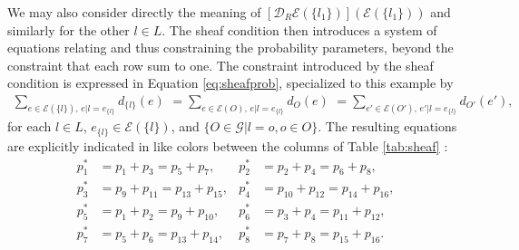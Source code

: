 \documentclass[10pt]{article}
\begin{document}
We may also consider directly the meaning of $\left[\mathcal{D}_R\mathcal{E}(\{l_1\})\right](\mathcal{E}(\{l_1\}))$ and similarly for the other $l \in L$. The sheaf condition then introduces a system of equations relating and thus constraining the probability parameters, beyond the constraint that each row sum to one. The constraint introduced by the sheaf condition is expressed in Equation \ref{eq:sheafprob}, specialized to this example by
\begin{eqnarray}\label{eq:sheafprob2}
\sum_{e \in \mathcal{E}(\{l\}),\, e|l=e_{\{l\}}} d_{\{l\}}(e) \,\, = \sum_{e \in \mathcal{E}(O),\, e|l=e_{\{l\}}} d_O(e) \,\, = \sum_{e' \in \mathcal{E}(O'),\, e'|l=e_{\{l\}}} d_{O'}(e'),
\end{eqnarray}
for each $l \in L$, $e_{\{l\}} \in \mathcal{E}(\{l\})$, and $\{O \in \mathcal{G}|l=o, o \in O\}$. The resulting equations are explicitly indicated in like colors between the columns of Table \ref{tab:sheaf} :
\begin{equation}
\begin{aligned}\label{eq:pparsys}
p^*_1 &= p_1 + p_3 = p_5 + p_7, &
p^*_2 &= p_2 + p_4 = p_6 + p_8,\\
p^*_3 &= p_9 + p_{11} = p_{13} + p_{15},&
p^*_4 &= p_{10} + p_{12} = p_{14} + p_{16},\\
p^*_5 &= p_1 + p_2 = p_9 + p_{10},&
p^*_6 &= p_3 + p_4 = p_{11} + p_{12},\\
p^*_7 &= p_5 + p_6 = p_{13} + p_{14},&
p^*_8 &= p_7 + p_8 = p_{15} + p_{16}.
\end{aligned}
\end{equation}
\end{document}
